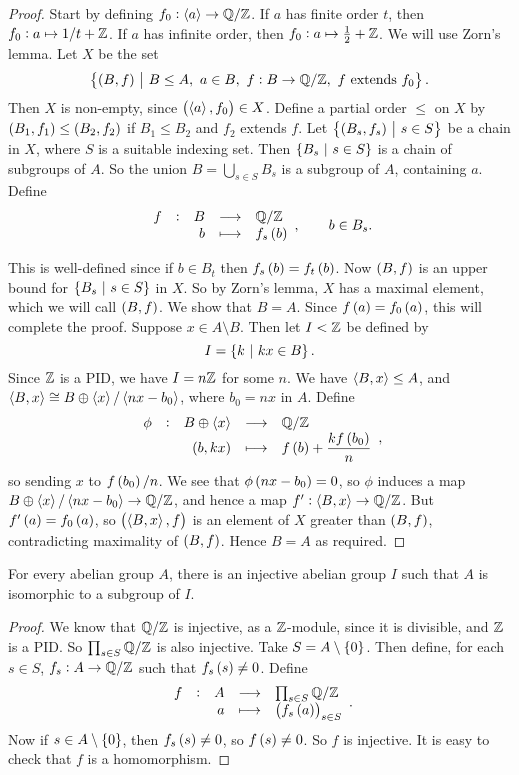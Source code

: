 \begin{proof}
Start by defining $ f_0 : \left\langle a \right\rangle \to \mathbb{Q} / \mathbb{Z} $. If $ a $ has finite order $ t $, then $ f_0 : a \mapsto 1 / t + \mathbb{Z} $. If $ a $ has infinite order, then $ f_0 : a \mapsto \tfrac{1}{2} + \mathbb{Z} $. We will use Zorn's lemma. Let $ X $ be the set
$$ \cbr{\br{B, f} \st B \le A, \ a \in B, \ f : B \to \QQ / \ZZ, \ f \ \text{extends} \ f_0}. $$
Then $ X $ is non-empty, since $ \br{\abr{a}, f_0} \in X $. Define a partial order $ \le $ on $ X $ by $ \br{B_1, f_1} \le \br{B_2, f_2} $ if $ B_1 \le B_2 $ and $ f_2 $ extends $ f $. Let $ \cbr{\br{B_s, f_s} \st s \in S} $ be a chain in $ X $, where $ S $ is a suitable indexing set. Then $ \cbr{B_s \st s \in S} $ is a chain of subgroups of $ A $. So the union $ B = \bigcup_{s \in S} B_s $ is a subgroup of $ A $, containing $ a $. Define
$$ \function[f]{B}{\QQ / \ZZ}{b}{f_s\br{b}}, \qquad b \in B_s. $$

\pagebreak

This is well-defined since if $ b \in B_t $ then $ f_s\br{b} = f_t\br{b} $. Now $ \br{B, f} $ is an upper bound for $ \cbr{B_s \st s \in S} $ in $ X $. So by Zorn's lemma, $ X $ has a maximal element, which we will call $ \br{B, f} $. We show that $ B = A $. Since $ f\br{a} = f_0\br{a} $, this will complete the proof. Suppose $ x \in A \setminus B $. Then let $ I < \mathbb{Z} $ be defined by
$$ I = \cbr{k \st kx \in B}. $$
Since $ \mathbb{Z} $ is a PID, we have $ I = n\mathbb{Z} $ for some $ n $. We have $ \left\langle B, x \right\rangle \le A $, and $ \left\langle B, x \right\rangle \cong B \oplus \left\langle x \right\rangle / \left\langle nx - b_0 \right\rangle $, where $ b_0 = nx $ in $ A $. Define
$$ \function[\phi]{B \oplus \abr{x}}{\QQ / \ZZ}{\br{b, kx}}{f\br{b} + \dfrac{kf\br{b_0}}{n}}, $$
so sending $ x $ to $ f\br{b_0} / n $. We see that $ \phi\br{nx - b_0} = 0 $, so $ \phi $ induces a map $ B \oplus \left\langle x \right\rangle / \left\langle nx - b_0 \right\rangle \to \mathbb{Q} / \mathbb{Z} $, and hence a map $ f' : \left\langle B, x \right\rangle \to \mathbb{Q} / \mathbb{Z} $. But $ f'\br{a} = f_0\br{a} $, so $ \br{\abr{B, x}, f} $ is an element of $ X $ greater than $ \br{B, f} $, contradicting maximality of $ \br{B, f} $. Hence $ B = A $ as required.
\end{proof}


\begin{proposition}
For every abelian group $ A $, there is an injective abelian group $ I $ such that $ A $ is isomorphic to a subgroup of $ I $.
\end{proposition}

\begin{proof}
We know that $ \mathbb{Q} / \mathbb{Z} $ is injective, as a $ \mathbb{Z} $-module, since it is divisible, and $ \mathbb{Z} $ is a PID. So $ \prod_{s \in S} \mathbb{Q} / \mathbb{Z} $ is also injective. Take $ S = A \setminus \cbr{0} $. Then define, for each $ s \in S $, $ f_s : A \to \mathbb{Q} / \mathbb{Z} $ such that $ f_s\br{s} \ne 0 $. Define
$$ \function[f]{A}{\prod_{s \in S} \QQ / \ZZ}{a}{\br{f_s\br{a}}_{s \in S}}. $$
Now if $ s \in A \setminus \cbr{0} $, then $ f_s\br{s} \ne 0 $, so $ f\br{s} \ne 0 $. So $ f $ is injective. It is easy to check that $ f $ is a homomorphism.
\end{proof}

